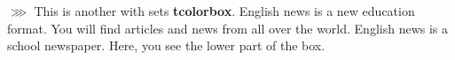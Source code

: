 \documentclass[a4paper,11pt]{ctexart}
\begin{document}
\begin{tcolorbox}[colback=white!95!red,colframe=black!30!red,title=\textbf{$\ggg$ My  nice  heading}]
$\ggg$ This  is  another with sets  \textbf{tcolorbox}.
English news is a new education format. You will find articles and news from all over the world. English news is a school newspaper.
\tcblower
Here,  you  see  the  lower  part  of  the  box.
\end{tcolorbox}
{\setlength{\parindent}{0pt}



}
\thispagestyle{empty}
\end{document}
